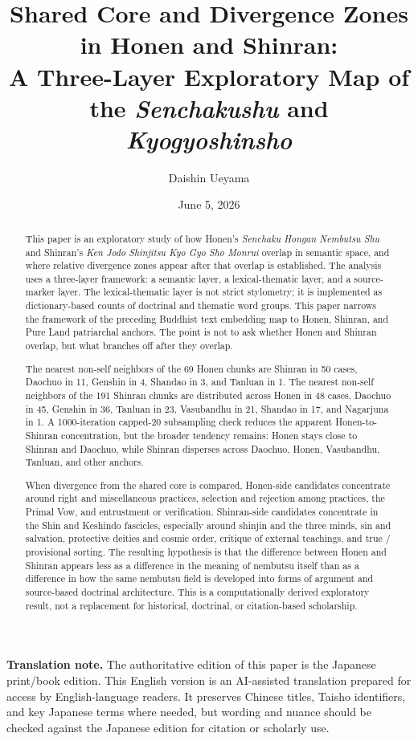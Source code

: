 \documentclass[uplatex,dvipdfmx,11pt,a4paper]{jsarticle}
\title{Shared Core and Divergence Zones in Honen and Shinran:\\[0.35em]A Three-Layer Exploratory Map of the \emph{Senchakushu} and \emph{Kyogyoshinsho}}
\author{Daishin Ueyama}
\date{June 5, 2026}
\begin{document}
\maketitle

\noindent\textbf{Translation note.}
The authoritative edition of this paper is the Japanese print/book edition. This English version is an AI-assisted translation prepared for access by English-language readers. It preserves Chinese titles, Taisho identifiers, and key Japanese terms where needed, but wording and nuance should be checked against the Japanese edition for citation or scholarly use.

\begin{abstract}
This paper is an exploratory study of how Honen's \emph{Senchaku Hongan Nembutsu Shu} and Shinran's \emph{Ken Jodo Shinjitsu Kyo Gyo Sho Monrui} overlap in semantic space, and where relative divergence zones appear after that overlap is established. The analysis uses a three-layer framework: a semantic layer, a lexical-thematic layer, and a source-marker layer. The lexical-thematic layer is not strict stylometry; it is implemented as dictionary-based counts of doctrinal and thematic word groups. This paper narrows the framework of the preceding Buddhist text embedding map \cite{ueyama2026three-layer-map} to Honen, Shinran, and Pure Land patriarchal anchors. The point is not to ask whether Honen and Shinran overlap, but what branches off after they overlap.

The nearest non-self neighbors of the 69 Honen chunks are Shinran in 50 cases, Daochuo in 11, Genshin in 4, Shandao in 3, and Tanluan in 1. The nearest non-self neighbors of the 191 Shinran chunks are distributed across Honen in 48 cases, Daochuo in 45, Genshin in 36, Tanluan in 23, Vasubandhu in 21, Shandao in 17, and Nagarjuna in 1. A 1000-iteration capped-20 subsampling check reduces the apparent Honen-to-Shinran concentration, but the broader tendency remains: Honen stays close to Shinran and Daochuo, while Shinran disperses across Daochuo, Honen, Vasubandhu, Tanluan, and other anchors.

When divergence from the shared core is compared, Honen-side candidates concentrate around right and miscellaneous practices, selection and rejection among practices, the Primal Vow, and entrustment or verification. Shinran-side candidates concentrate in the Shin and Keshindo fascicles, especially around shinjin and the three minds, sin and salvation, protective deities and cosmic order, critique of external teachings, and true / provisional sorting. The resulting hypothesis is that the difference between Honen and Shinran appears less as a difference in the meaning of nembutsu itself than as a difference in how the same nembutsu field is developed into forms of argument and source-based doctrinal architecture. This is a computationally derived exploratory result, not a replacement for historical, doctrinal, or citation-based scholarship.
\end{abstract}
\end{document}
